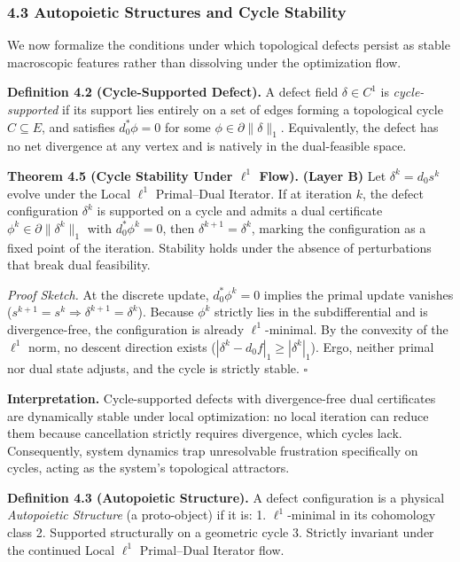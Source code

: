 \documentclass[
]{article}
\begin{document}
\subsubsection{4.3 Autopoietic Structures and Cycle
Stability}\label{autopoietic-structures-and-cycle-stability}

We now formalize the conditions under which topological defects persist
as stable macroscopic features rather than dissolving under the
optimization flow.

\textbf{Definition 4.2 (Cycle-Supported Defect).} A defect field
\(\delta \in C^1\) is \emph{cycle-supported} if its support lies
entirely on a set of edges forming a topological cycle
\(C \subseteq E\), and satisfies \(d_0^* \phi = 0\) for some
\(\phi \in \partial \|\delta\|_1\). Equivalently, the defect has no net
divergence at any vertex and is natively in the dual-feasible space.

\textbf{Theorem 4.5 (Cycle Stability Under \(\ell^1\) Flow).}
\textbf{(Layer B)} Let \(\delta^k = d_0 s^k\) evolve under the Local
\(\ell^1\) Primal--Dual Iterator. If at iteration \(k\), the defect
configuration \(\delta^k\) is supported on a cycle and admits a dual
certificate \(\phi^k \in \partial \|\delta^k\|_1\) with
\(d_0^* \phi^k = 0\), then \(\delta^{k+1} = \delta^k\), marking the
configuration as a fixed point of the iteration. Stability holds under
the absence of perturbations that break dual feasibility.

\emph{Proof Sketch.} At the discrete update, \(d_0^* \phi^k = 0\)
implies the primal update vanishes
(\(s^{k+1} = s^k \Rightarrow \delta^{k+1} = \delta^k\)). Because
\(\phi^k\) strictly lies in the subdifferential and is divergence-free,
the configuration is already \(\ell^1\)-minimal. By the convexity of the
\(\ell^1\) norm, no descent direction exists
(\(|\delta^k - d_0 f|_1 \ge |\delta^k|_1\)). Ergo, neither primal nor
dual state adjusts, and the cycle is strictly stable. \(\square\)

\textbf{Interpretation.} Cycle-supported defects with divergence-free
dual certificates are dynamically stable under local optimization: no
local iteration can reduce them because cancellation strictly requires
divergence, which cycles lack. Consequently, system dynamics trap
unresolvable frustration specifically on cycles, acting as the system's
topological attractors.

\textbf{Definition 4.3 (Autopoietic Structure).} A defect configuration
is a physical \emph{Autopoietic Structure} (a proto-object) if it is: 1.
\(\ell^1\)-minimal in its cohomology class 2. Supported structurally on
a geometric cycle 3. Strictly invariant under the continued Local
\(\ell^1\) Primal--Dual Iterator flow.
\end{document}
